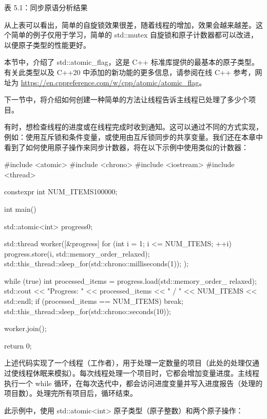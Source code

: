 \begin{center}
表 5.1：同步原语分析结果
\end{center}

从上表可以看出，简单的自旋锁效果很差，随着线程的增加，效果会越来越差。这个简单的例子仅用于学习，简单的 std::mutex 自旋锁和原子计数器都可以改进，以便原子类型的性能更好。

本节中，介绍了 std::atomic\_flag，这是 C++ 标准库提供的最基本的原子类型。有关此类型以及 C++20 中添加的新功能的更多信息，请参阅在线 C++ 参考，网址为 \url{https://en.cppreference.com/w/cpp/atomic/atomic_flag}。

下一节中，将介绍如何创建一种简单的方法让线程告诉主线程已处理了多少个项目。


有时，想检查线程的进度或在线程完成时收到通知。这可以通过不同的方式实现，例如：使用互斥锁和条件变量，或使用由互斥锁同步的共享变量。我们还在本章中看到了如何使用原子操作来同步计数器，将在以下示例中使用类似的计数器：

\begin{cpp}
#include <atomic>
#include <chrono>
#include <iostream>
#include <thread>

constexpr int NUM_ITEMS{100000};

int main() {
    std::atomic<int> progress{0};

    std::thread worker([&progress] {
        for (int i = 1; i <= NUM_ITEMS; ++i) {
            progress.store(i, std::memory_order_relaxed);
            std::this_thread::sleep_for(std::chrono::milliseconds(1));
        }
    });

    while (true) {
        int processed_items = progress.load(std::memory_order_
        relaxed);
        std::cout << "Progress: "
                  << processed_items << " / " << NUM_ITEMS
                  << std::endl;
        if (processed_items == NUM_ITEMS) {
            break;
        }
        std::this_thread::sleep_for(std::chrono::seconds(10));
    }

    worker.join();

    return 0;
}
\end{cpp}

上述代码实现了一个线程（工作者），用于处理一定数量的项目（此处的处理仅通过使线程休眠来模拟）。每次线程处理一个项目时，它都会增加变量进度。主线程执行一个 while 循环，在每次迭代中，都会访问进度变量并写入进度报告（处理的项目数）。处理完所有项目后，循环结束。

此示例中，使用 std::atomic<int> 原子类型（原子整数）和两个原子操作：

